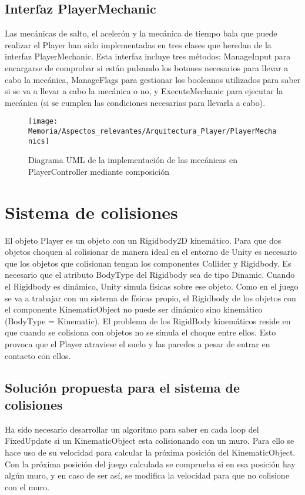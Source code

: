 \subsection{Interfaz PlayerMechanic}
Las mecánicas de salto, el acelerón y la mecánica de tiempo bala que puede realizar el Player han sido implementadas en tres clases que heredan de la interfaz PlayerMechanic. Esta interfaz incluye tres métodos: ManageInput para encargarse de comprobar si están pulsando los botones necesarios para llevar a cabo la mecánica, ManageFlags para gestionar los booleanos utilizados para saber si se va a llevar a cabo la mecánica o no, y ExecuteMechanic para ejecutar la mecánica (si se cumplen las condiciones necesarias para llevarla a cabo).

\begin{figure}[h]
\centering
\texttt{[image: Memoria/Aspectos\_relevantes/Arquitectura\_Player/PlayerMechanics]}
\caption{Diagrama UML de la implementación de las mecánicas en PlayerController mediante composición}
\end{figure}

\section{Sistema de colisiones \cite{ContinuousCollision}\cite{UnderstandingConstraints}}
El objeto Player es un objeto con un Rigidbody2D kinemático. Para que dos objetos choquen al colisionar de manera ideal en el entorno de Unity es necesario que los objetos que colisionan tengan los componentes Collider y Rigidbody. Es necesario que el atributo BodyType del Rigidbody sea de tipo Dinamic. Cuando el Rigidbody es dinámico, Unity simula físicas sobre ese objeto. Como en el juego se va a trabajar con un sistema de físicas propio, el Rigidbody de los objetos con el componente KinematicObject no puede ser dinámico sino kinemático (BodyType = Kinematic). El problema de los RigidBody kinemáticos reside en que cuando se colisiona con objetos no se simula el choque entre ellos. Esto provoca que el Player atraviese el suelo y las paredes a pesar de entrar en contacto con ellos.

\subsection{Solución propuesta para el sistema de colisiones}
Ha sido necesario desarrollar un algoritmo para saber en cada loop del FixedUpdate si un KinematicObject esta colisionando con un muro. Para ello se hace uso de su velocidad para calcular la próxima posición del KinematicObject.\\
Con la próxima posición del juego calculada se comprueba si en esa posición hay algún muro, y en caso de ser así, se modifica la velocidad para que no colisione con el muro.

